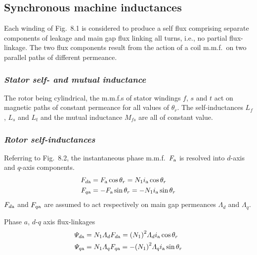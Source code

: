 \documentclass[a4paper,numbers=noenddot,12pt]{scrbook}
\begin{document}
        \subsection{Synchronous machine inductances}
        Each winding of Fig.\ 8.1 is considered to produce a self flux comprising separate components of leakage and main gap flux linking all turns, i.e., no partial flux-linkage. The two flux components result from the action of a coil m.m.f.\ on two parallel paths of different permeance.

        \subsubsection{\textit{Stator self- and mutual inductance}}
        The rotor being cylindrical, the m.m.f.s of stator windings $f$, $s$ and $t$ act on magnetic paths of constant permeance for all values of $\theta_r$. The self-inductances $L_f$, $L_s$ and $L_t$ and the mutual inductance $M_{fs}$ are all of constant value.

        \subsubsection{\textit{Rotor self-inductances}}
        Referring to Fig.\ 8.2, the instantaneous phase m.m.f.\ $F_{\textup{a}}$ is resolved into $d$-axis and $q$-axis components.
        \begin{equation}
            \begin{aligned}
                F_{d\textup{a}} & = F_{\textup{a}} \cos \theta_r = N_1 i_{\textup{a}} \cos \theta_r \\
                F_{q\textup{a}} & = - F_{\textup{a}} \sin \theta_r = - N_1 i_{\textup{a}} \sin \theta_r
            \end{aligned}
            \label{eq:Eq8.1}
        \end{equation}
        $F_{d\textup{a}}$ and $F_{q\textup{a}}$ are assumed to act respectively on main gap permeances $\varLambda_d$ and $\varLambda_q$.

        Phase $a$, $d$-$q$ axis flux-linkages
        \begin{equation}
            \begin{aligned}
                \varPsi_{d\textup{a}} & = N_1 \varLambda_d F_{d\textup{a}} = {(N_1)}^2 \varLambda_d i_{\textup{a}} \cos \theta_r \\
                \varPsi_{q\textup{a}} & = N_1 \varLambda_q F_{q\textup{a}} = - {(N_1)}^2 \varLambda_q i_{\textup{a}} \sin \theta_r 
            \end{aligned}
            \label{eq:Eq8.2}
        \end{equation}
\end{document}
